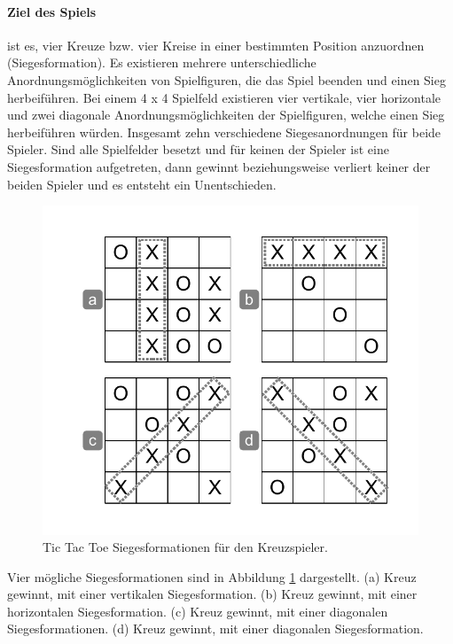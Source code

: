 \paragraph{Ziel des Spiels} ist es, vier Kreuze bzw. vier Kreise in einer bestimmten Position anzuordnen (Siegesformation). Es existieren mehrere unterschiedliche Anordnungsmöglichkeiten von Spielfiguren, die das Spiel beenden und einen Sieg herbeiführen. Bei einem 4 x 4 Spielfeld existieren vier vertikale, vier horizontale und zwei diagonale Anordnungsmöglichkeiten der Spielfiguren, welche einen Sieg herbeiführen würden. Insgesamt zehn verschiedene Siegesanordnungen für beide Spieler. Sind alle Spielfelder besetzt und für keinen der Spieler ist eine Siegesformation aufgetreten, dann gewinnt beziehungsweise verliert keiner der beiden Spieler und es entsteht ein Unentschieden. \\

\begin{figure}[!htbp]
  \centering
  \includegraphics[scale = 0.6]{inhalt/abbildungen/siegesbedingungen_tictactoe.pdf}
  \caption{Tic Tac Toe Siegesformationen für den Kreuzspieler.}
  \label{fig:siegesbedingungen_tictactoe}
\end{figure}

Vier mögliche Siegesformationen sind in Abbildung \ref{fig:siegesbedingungen_tictactoe} dargestellt. (a) Kreuz gewinnt, mit einer vertikalen Siegesformation. (b) Kreuz gewinnt, mit einer horizontalen Siegesformation. (c) Kreuz gewinnt, mit einer diagonalen Siegesformationen. (d) Kreuz gewinnt, mit einer diagonalen Siegesformation.
\newpage

